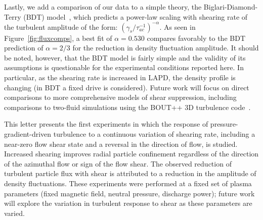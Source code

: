 \documentclass[aip,pop,amsmath,amssymb,preprint,superscriptaddress]{revtex4-1} %
\begin{document}
Lastly, we add a comparison of our data to a simple theory, the
Biglari-Diamond-Terry (BDT) model~\cite{biglari90}, which predicts a
power-law scaling with shearing rate of the turbulent
amplitude of the form: $\left(\gamma_{s}/\tau_{ac}^{-1}\right)^{-\alpha}$. As seen in
Figure~\ref{fig:fluxcomps}, a best fit of $\alpha = 0.530$ compares
favorably to the BDT prediction of $\alpha = 2/3$ for the reduction in
density fluctuation amplitude. 
It should be noted, however, that the
BDT model is fairly simple and the validity of its assumptions is
questionable for the experimental conditions reported here.  In
particular, as the shearing rate is increased in LAPD, the density
profile is changing (in BDT a fixed drive is considered).  Future work
will focus on direct comparisons to more comprehensive models of shear
suppression, including comparisons to two-fluid simulations using the
BOUT++ 3D turbulence code~\cite{umansky11}.  

This letter presents the first experiments in which the response of
pressure-gradient-driven turbulence to a continuous
variation of shearing rate, including a near-zero flow shear state and
a reversal in the direction of flow, is studied.  Increased shearing
improves radial particle confinement regardless of the direction of
the azimuthal flow or sign of the flow shear. The observed reduction of
turbulent particle flux with shear is attributed to a reduction in the
amplitude of density fluctuations. These
experiments were performed at a fixed set of plasma parameters (fixed
magnetic field, neutral pressure, discharge power); future work will
explore the variation in turbulent response to shear as these
parameters are varied.  
\end{document}
